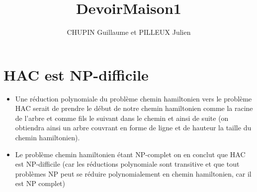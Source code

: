 \documentclass[10pt, a4paper]{article}
\title{DevoirMaison1}
\author {CHUPIN Guillaume et PILLEUX Julien}
\begin{document}
\maketitle
\thispagestyle {empty}
\newpage
\tableofcontents
\newpage

\section {HAC est NP-difficile}
\begin {itemize}
\item Une réduction polynomiale du problème chemin hamiltonien vers le problème HAC serait de prendre le début de notre chemin hamiltonien comme la racine de l'arbre et comme fils le suivant dans le chemin et ainsi de suite (on obtiendra ainsi un arbre couvrant en forme de ligne et de hauteur la taille du chemin hamiltonien).
\item Le problème chemin hamiltonien étant NP-complet on en conclut que HAC est NP-difficile (car les réductions polynomiale sont transitive et que tout problèmes NP peut se réduire polynomialement en chemin hamiltonien, car il est NP complet)
\end {itemize}
\end{document}
